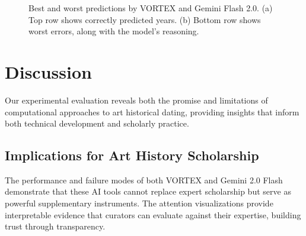 \documentclass[10pt,twocolumn,letterpaper]{article}
\begin{document}
\begin{figure}[t]
\vspace{0.5em}




\caption{Best and worst predictions by VORTEX and Gemini Flash 2.0. (a) Top row shows correctly predicted years. (b) Bottom row shows worst errors, along with the model's reasoning.}
\label{fig:predictions}
\end{figure}


\section{Discussion}

Our experimental evaluation reveals both the promise and limitations of computational approaches to art historical dating, providing insights that inform both technical development and scholarly practice.

\subsection{Implications for Art History Scholarship}

The performance and failure modes of both VORTEX and Gemini 2.0 Flash demonstrate that these AI tools cannot replace expert scholarship but serve as powerful supplementary instruments. 
The attention visualizations provide interpretable evidence that curators can evaluate against their expertise, building trust through transparency.
\end{document}
